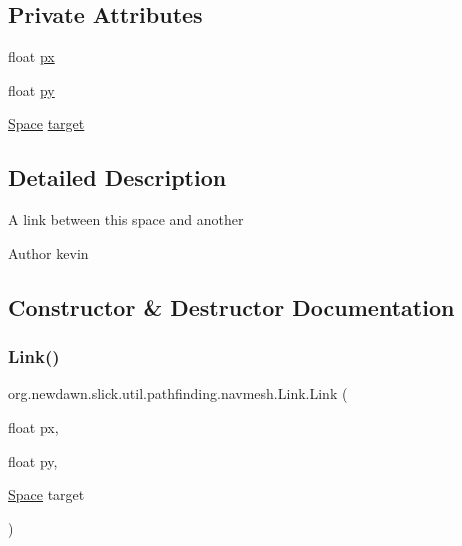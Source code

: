 \subsection*{Private Attributes}
\begin{DoxyCompactItemize}
\item 
float \mbox{\hyperlink{classorg_1_1newdawn_1_1slick_1_1util_1_1pathfinding_1_1navmesh_1_1_link_a83c2e5065b4ed17f607670d6d295bdb0}{px}}
\item 
float \mbox{\hyperlink{classorg_1_1newdawn_1_1slick_1_1util_1_1pathfinding_1_1navmesh_1_1_link_afeb36f879009f5cda66275dd065dfdf2}{py}}
\item 
\mbox{\hyperlink{classorg_1_1newdawn_1_1slick_1_1util_1_1pathfinding_1_1navmesh_1_1_space}{Space}} \mbox{\hyperlink{classorg_1_1newdawn_1_1slick_1_1util_1_1pathfinding_1_1navmesh_1_1_link_a8820429c2405bded1a2414a245745adf}{target}}
\end{DoxyCompactItemize}


\subsection{Detailed Description}
A link between this space and another

\begin{DoxyAuthor}{Author}
kevin 
\end{DoxyAuthor}


\subsection{Constructor \& Destructor Documentation}
\mbox{\label{classorg_1_1newdawn_1_1slick_1_1util_1_1pathfinding_1_1navmesh_1_1_link_a227fb2c96e55e5637e38d354044b149d}} 
\subsubsection{\texorpdfstring{Link()}{Link()}}
{\footnotesize\ttfamily org.\+newdawn.\+slick.\+util.\+pathfinding.\+navmesh.\+Link.\+Link (\begin{DoxyParamCaption}\item[{float}]{px,  }\item[{float}]{py,  }\item[{\mbox{\hyperlink{classorg_1_1newdawn_1_1slick_1_1util_1_1pathfinding_1_1navmesh_1_1_space}{Space}}}]{target }\end{DoxyParamCaption})\hspace{0.3cm}{\ttfamily [inline]}}

